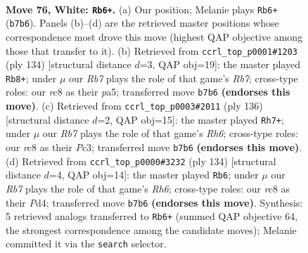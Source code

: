 \documentclass[11pt]{article}
\begin{document}
\clearpage

\begin{figure}[p]\centering
\begin{subfigure}{0.46\textwidth}\centering
\resizebox{\linewidth}{!}{%
\newchessgame
\chessboard[
  setfen={2r5/1R6/7k/8/5K2/8/3r3P/8 w - - 19 76},
  showmover=false,
  pgfstyle=straightmove, color=movearrow, markmove={b7-b6}
]}
\caption{}
\end{subfigure}\hfill
\begin{subfigure}{0.46\textwidth}\centering
\resizebox{\linewidth}{!}{%
\newchessgame
\chessboard[
  setfen={6k1/1R6/8/p7/2r3P1/8/8/4K3 w - - 19 68},
  showmover=false,
  pgfstyle=straightmove, color=movearrow, markmove={b7-b8}
]}
\caption{}
\end{subfigure}
\\[4pt]
\begin{subfigure}{0.46\textwidth}\centering
\resizebox{\linewidth}{!}{%
\newchessgame
\chessboard[
  setfen={8/1k6/7R/2K5/P7/2P5/8/r7 w - - 25 69},
  showmover=false,
  pgfstyle=straightmove, color=movearrow, markmove={h6-h7}
]}
\caption{}
\end{subfigure}\hfill
\begin{subfigure}{0.46\textwidth}\centering
\resizebox{\linewidth}{!}{%
\newchessgame
\chessboard[
  setfen={8/3k4/7R/P7/1p1P4/6K1/r7/8 w - - 0 68},
  showmover=false,
  pgfstyle=straightmove, color=movearrow, markmove={h6-b6}
]}
\caption{}
\end{subfigure}
\caption{\textbf{Move 76, White: \texttt{Rb6+}.} (a) Our position; Melanie plays \texttt{Rb6+} (\texttt{b7b6}). Panels (b)--(d) are the retrieved master positions whose correspondence most drove this move (highest QAP objective among those that transfer to it). (b) Retrieved from \texttt{ccrl\_top\_p0001\#1203} (ply 134) [structural distance $d$=3, QAP obj=19]: the master played \texttt{Rb8+}; under $\mu$ our \emph{Rb7} plays the role of that game's \emph{Rb7}; cross-type roles: our \emph{r}c8 as their \emph{p}a5; transferred move \texttt{b7b6} \textbf{(endorses this move)}. (c) Retrieved from \texttt{ccrl\_top\_p0003\#2011} (ply 136) [structural distance $d$=2, QAP obj=15]: the master played \texttt{Rh7+}; under $\mu$ our \emph{Rb7} plays the role of that game's \emph{Rh6}; cross-type roles: our \emph{r}c8 as their \emph{P}c3; transferred move \texttt{b7b6} \textbf{(endorses this move)}. (d) Retrieved from \texttt{ccrl\_top\_p0000\#3232} (ply 134) [structural distance $d$=4, QAP obj=14]: the master played \texttt{Rb6}; under $\mu$ our \emph{Rb7} plays the role of that game's \emph{Rh6}; cross-type roles: our \emph{r}c8 as their \emph{P}d4; transferred move \texttt{b7b6} \textbf{(endorses this move)}. Synthesis: 5 retrieved analogs transferred to \texttt{Rb6+} (summed QAP objective 64, the strongest correspondence among the candidate moves); Melanie committed it via the \texttt{search} selector.}
\label{fig:thought-m150}
\end{figure}
\end{document}
